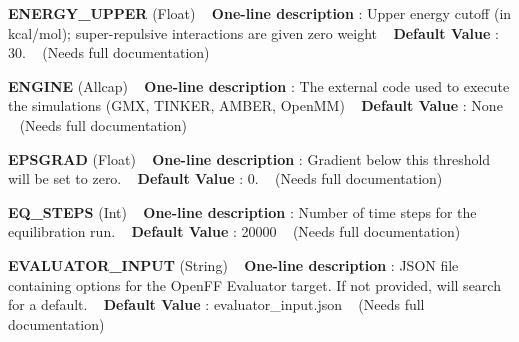 \begin{DoxyItemize}
\item {\bfseries  E\+N\+E\+R\+G\+Y\+\_\+\+U\+P\+P\+ER } (Float) ~\newline
{\bfseries  One-\/line description }\+: Upper energy cutoff (in kcal/mol); super-\/repulsive interactions are given zero weight ~\newline
{\bfseries  Default Value }\+: 30. ~\newline
(Needs full documentation)\end{DoxyItemize}
\begin{DoxyItemize}
\item {\bfseries  E\+N\+G\+I\+NE } (Allcap) ~\newline
{\bfseries  One-\/line description }\+: The external code used to execute the simulations (G\+MX, T\+I\+N\+K\+ER, A\+M\+B\+ER, Open\+MM) ~\newline
{\bfseries  Default Value }\+: None ~\newline
(Needs full documentation)\end{DoxyItemize}
\begin{DoxyItemize}
\item {\bfseries  E\+P\+S\+G\+R\+AD } (Float) ~\newline
{\bfseries  One-\/line description }\+: Gradient below this threshold will be set to zero. ~\newline
{\bfseries  Default Value }\+: 0. ~\newline
(Needs full documentation)\end{DoxyItemize}
\begin{DoxyItemize}
\item {\bfseries  E\+Q\+\_\+\+S\+T\+E\+PS } (Int) ~\newline
{\bfseries  One-\/line description }\+: Number of time steps for the equilibration run. ~\newline
{\bfseries  Default Value }\+: 20000 ~\newline
(Needs full documentation)\end{DoxyItemize}
\begin{DoxyItemize}
\item {\bfseries  E\+V\+A\+L\+U\+A\+T\+O\+R\+\_\+\+I\+N\+P\+UT } (String) ~\newline
{\bfseries  One-\/line description }\+: J\+S\+ON file containing options for the Open\+FF Evaluator target. If not provided, will search for a default. ~\newline
{\bfseries  Default Value }\+: evaluator\+\_\+input.\+json ~\newline
(Needs full documentation)\end{DoxyItemize}
